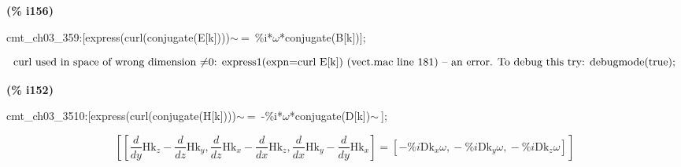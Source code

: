 \documentclass[fleqn]{article}
\begin{document}
\noindent
\begin{minipage}[t]{4.000000em}\color{red}\bfseries
(\% i156)	
\end{minipage}
\begin{minipage}[t]{\textwidth}\color{blue}
cmt\_ch03\_359:[express(curl(conjugate(E[k])))\ensuremath{\sim\ }=\ \%i*\ensuremath{\omega}*conjugate(B[k])];
\end{minipage}
\[\displaystyle \mbox{%
curl used in space of wrong dimension
}\mbox{%
\ensuremath{\neq}0: express1(expn=curl E[k]) (vect.mac line 181)
}\mbox{%
 -- an error. To debug this try: debugmode(true);}\mbox{}
\]


\noindent
\begin{minipage}[t]{4.000000em}\color{red}\bfseries
(\% i152)	
\end{minipage}
\begin{minipage}[t]{\textwidth}\color{blue}
cmt\_ch03\_3510:[express(curl(conjugate(H[k])))\ensuremath{\sim\ }=\ -\%i*\ensuremath{\omega}*conjugate(D[k])\ensuremath{\sim\ }];
\end{minipage}
\[\displaystyle \tag{cmt\_ ch03\_ 3510} 
\left[ \left[ \frac{d}{d y} {{\ensuremath{\mathrm{Hk}}}_z}-\frac{d}{d z} {{\ensuremath{\mathrm{Hk}}}_y}\operatorname{,}\frac{d}{d z} {{\ensuremath{\mathrm{Hk}}}_x}-\frac{d}{d x} {{\ensuremath{\mathrm{Hk}}}_z}\operatorname{,}\frac{d}{d x} {{\ensuremath{\mathrm{Hk}}}_y}-\frac{d}{d y} {{\ensuremath{\mathrm{Hk}}}_x}\right] =\left[ -\% i {{\ensuremath{\mathrm{Dk}}}_x} \omega \operatorname{,}-\% i {{\ensuremath{\mathrm{Dk}}}_y} \omega \operatorname{,}-\% i {{\ensuremath{\mathrm{Dk}}}_z} \omega \right] \right] \mbox{}
\]
\end{document}
